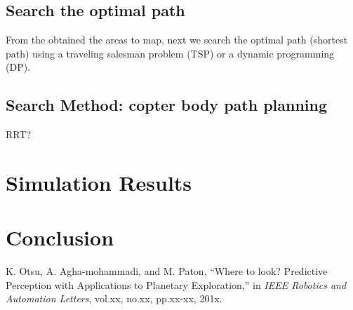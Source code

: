 \documentclass[conference]{IEEEtran}
\begin{document}
\subsection{Search the optimal path}
From the obtained the areas to map, next we search the optimal path (shortest path) using a traveling salesman problem (TSP) or a dynamic programming (DP).  

\textcolor[gray]{0.5}{
\section{Search Method: copter body path planning}
RRT?
}

\section{Simulation Results}

\section{Conclusion}

\begin{thebibliography}{1}

K. Otsu, A. Agha-mohammadi, and M. Paton, ``Where to look? Predictive Perception with Applications to Planetary Exploration,'' in {\it IEEE Robotics and Automation Letters}, vol.xx, no.xx, pp.xx-xx, 201x.

\end{thebibliography}
\end{document}
